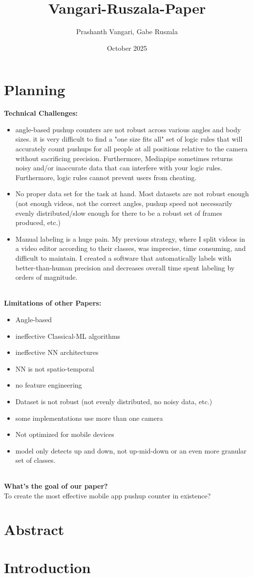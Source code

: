 \documentclass{article}
\title{Vangari-Ruszala-Paper}
\author{Prashanth Vangari, Gabe Ruszala}
\date{October 2025}
\begin{document}
\maketitle

\section{Planning}
\textbf{Technical Challenges:}
\begin{itemize}
    \item angle-based pushup counters are not robust across various angles and body sizes. it is very difficult to find a "one size fits all" set of logic rules that will accurately count pushups for all people at all positions relative to the camera without sacrificing precision. Furthermore, Mediapipe sometimes returns noisy and/or inaccurate data that can interfere with your logic rules. Furthermore, logic rules cannot prevent users from cheating.
    \item No proper data set for the task at hand. Most datasets are not robust enough (not enough videos, not the correct angles, pushup speed not necessarily evenly distributed/slow enough for there to be a robust set of frames produced, etc.)
    \item Manual labeling is a huge pain. My previous strategy, where I split videos in a video editor according to their classes, was imprecise, time consuming, and difficult to maintain. I created a software that automatically labels with better-than-human precision and decreases overall time spent labeling by orders of magnitude.
\end{itemize}
\\
\textbf{Limitations of other Papers:}
\begin{itemize}
    \item Angle-based
    \item ineffective Classical-ML algorithms
    \item ineffective NN architectures
    \item NN is not spatio-temporal
    \item no feature engineering
    \item Dataset is not robust (not evenly distributed, no noisy data, etc.)
    \item some implementations use more than one camera
    \item Not optimized for mobile devices
    \item model only detects up and down, not up-mid-down or an even more granular set of classes.
\end{itemize}
\\
\textbf{What's the goal of our paper?}\\
To create the most effective mobile app pushup counter in existence?

\section{Abstract}

\section{Introduction}
\end{document}
